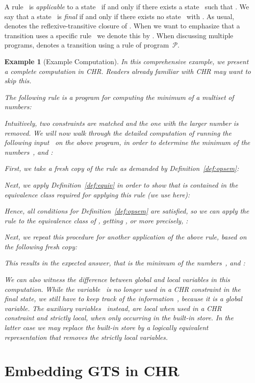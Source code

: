 \documentclass{tlp}
\newtheorem{example}{Example}[section]
\newcommand{\mcP}{\ensuremath{\mathcal{P}}}
\begin{document}
A rule~ is \emph{applicable} to a state~ if and only if there
exists a state~ such that . We say that a state~
is \emph{final} if and only if there exists no state~ with . As usual,  denotes the reflexive-transitive closure of .
When we want to emphasize that a transition uses a specific rule~ we denote
this by . When discussing multiple programs,  denotes a
transition using a rule of program~\mcP.

\begin{example}[Example Computation]
In this comprehensive example, we present a complete computation in CHR. Readers
already familiar with CHR may want to skip this.

The following rule \cite{fruehwirth09} is a program for computing the minimum of
a multiset of numbers: 

Intuitively, two  constraints are matched and the one with the larger
number is removed. We will now walk through the detailed computation of running
the following input~ on the above program, in order to determine the
minimum of the numbers~, and : 

First, we take a fresh copy of the rule as demanded by
Definition~\ref{def:opsem}: 

Next, we apply Definition~\ref{def:equiv} in order to show that  is
contained in the equivalence class required for applying this rule (we use
 here):


Hence, all conditions for Definition~\ref{def:opsem} are satisfied, so we can
apply the rule to the equivalence class of , getting , or more precisely, : 


Next, we repeat this procedure for another application of the above rule, based
on the following fresh copy: 

This results in the expected answer, that  is the minimum of the
numbers~, and :


We can also witness the difference between global and local variables in this
computation. While the variable~ is no longer used in a CHR constraint in the
final state, we still have to keep track of the information~, because it is
a global variable. The auxiliary variables~ instead, are local
when used in a CHR constraint and strictly local, when only occurring in the
built-in store. In the latter case we may replace the built-in store by a
logically equivalent representation that removes the strictly local variables.
\end{example}

\section{Embedding GTS in CHR}
\label{sec:encoding}
\end{document}
